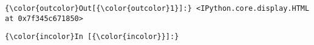 \documentclass{article}
\begin{document}
            \begin{Verbatim}[commandchars=\\\{\}]
{\color{outcolor}Out[{\color{outcolor}1}]:} <IPython.core.display.HTML at 0x7f345c671850>
\end{Verbatim}
        
    \begin{Verbatim}[commandchars=\\\{\}]
{\color{incolor}In [{\color{incolor}}]:} 
\end{Verbatim}


    
    
    
    
\end{document}
